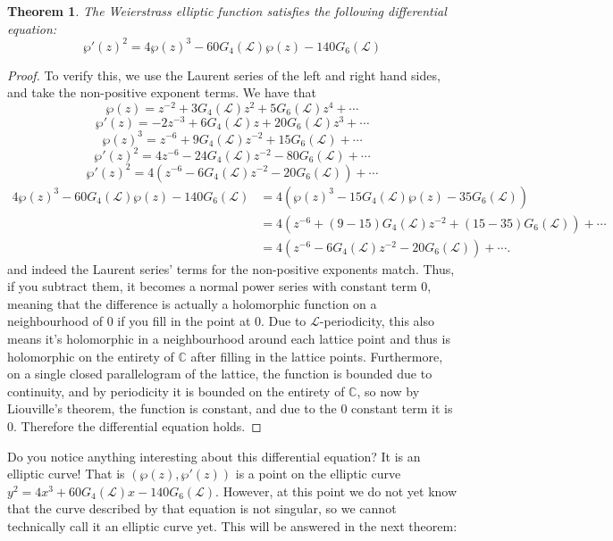 \documentclass{article}
\newtheorem{theorem}{Theorem}[section]
\theoremstyle{definition}
\theoremstyle{definition}
\theoremstyle{definition}
\begin{document}
\begin{theorem}
    The Weierstrass elliptic function satisfies the following differential equation:
$$\wp'(z)^2=4\wp(z)^3-60G_4(\mathcal L)\wp(z)-140G_6(\mathcal L)$$

\end{theorem}
\begin{proof}
    
To verify this, we use the Laurent series of the left and right hand sides, and take the non-positive exponent terms. We have that
$$\wp(z)=z^{-2}+3G_4(\mathcal L)z^2+5G_6(\mathcal L)z^4+\cdots$$
$$\wp'(z)=-2z^{-3}+6G_4(\mathcal L)z+20G_6(\mathcal L)z^3+\cdots$$
$$\wp(z)^3=z^{-6}+9G_4(\mathcal L)z^{-2}+15G_6(\mathcal L)+\cdots$$
$$\wp'(z)^2=4z^{-6}-24G_4(\mathcal L)z^{-2}-80G_6(\mathcal L)+\cdots$$
$$\wp'(z)^2=4(z^{-6}-6G_4(\mathcal L)z^{-2}-20G_6(\mathcal L))+\cdots$$
\begin{align*}
4\wp(z)^3-60G_4(\mathcal L)\wp(z)-140G_6(\mathcal L)&=4(\wp(z)^3-15G_4(\mathcal L)\wp(z)-35G_6(\mathcal L))\\
&=4(z^{-6}+(9-15)G_4(\mathcal L)z^{-2}+(15-35)G_6(\mathcal L))+\cdots\\
&=4(z^{-6}-6G_4(\mathcal L)z^{-2}-20G_6(\mathcal L))+\cdots.
\end{align*}
and indeed the Laurent series' terms for the non-positive exponents match. Thus, if you subtract them, it becomes a normal power series with constant term $0$, meaning that the difference is actually a holomorphic function on a neighbourhood of $0$ if you fill in the point at $0$. Due to $\mathcal L$-periodicity, this also means it's holomorphic in a neighbourhood around each lattice point and thus is holomorphic on the entirety of $\mathbb C$ after filling in the lattice points. Furthermore, on a single closed parallelogram of the lattice, the function is bounded due to continuity, and by periodicity it is bounded on the entirety of $\mathbb C$, so now by Liouville's theorem, the function is constant, and due to the $0$ constant term it is $0$. Therefore the differential equation holds.


\end{proof}

Do you notice anything interesting about this differential equation?
\newline\newline
It is an elliptic curve!
\newline\newline
That is $(\wp(z),\wp'(z))$ is a point on the elliptic curve $y^2=4x^3+60G_4(\mathcal L)x-140G_6(\mathcal L)$. However, at this point we do not yet know that the curve described by that equation is not singular, so we cannot technically call it an elliptic curve yet. This will be answered in the next theorem:
\end{document}
